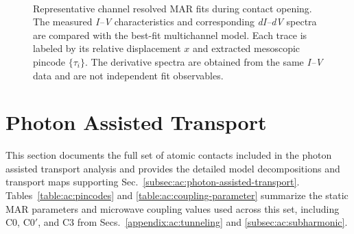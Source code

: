         \begin{figure}[t]
            \centering
            \\
            \caption{
                Representative channel resolved MAR fits during contact opening. The measured \textit{I--V} characteristics and corresponding \textit{dI--dV} spectra are compared with the best-fit multichannel model. Each trace is labeled by its relative displacement $x$ and extracted mesoscopic pincode $\{\tau_i\}$. The derivative spectra are obtained from the same \textit{I--V} data and are not independent fit observables.
            }
            \label{fig:ac:pincode:fits}
        \end{figure}

    \section{Photon Assisted Transport}
    \label{appendix:ac:photon-assisted-transport}

        This section documents the full set of atomic contacts included in the photon assisted transport analysis and provides the detailed model decompositions and transport maps supporting Sec.~\ref{subsec:ac:photon-assisted-transport}. Tables~\ref{table:ac:pincodes} and \ref{table:ac:coupling-parameter} summarize the static MAR parameters and microwave coupling values used across this set, including C0, C0$'$, and C3 from Secs.~\ref{appendix:ac:tunneling} and \ref{subsec:ac:subharmonic}.

